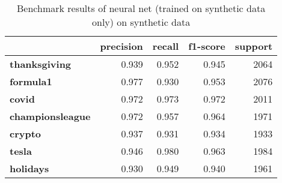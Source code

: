 \begin{table}
\centering
\caption{Benchmark results of neural net (trained on synthetic data only) on synthetic data}
\begin{tabular}{lrrrr}
\toprule
{} &  precision &  recall &  f1-score &  support \\
\midrule
\textbf{thanksgiving   } &      0.939 &   0.952 &     0.945 &     2064 \\
\textbf{formula1       } &      0.977 &   0.930 &     0.953 &     2076 \\
\textbf{covid          } &      0.972 &   0.973 &     0.972 &     2011 \\
\textbf{championsleague} &      0.972 &   0.957 &     0.964 &     1971 \\
\textbf{crypto         } &      0.937 &   0.931 &     0.934 &     1933 \\
\textbf{tesla          } &      0.946 &   0.980 &     0.963 &     1984 \\
\textbf{holidays       } &      0.930 &   0.949 &     0.940 &     1961 \\
\bottomrule
\end{tabular}
\end{table}
